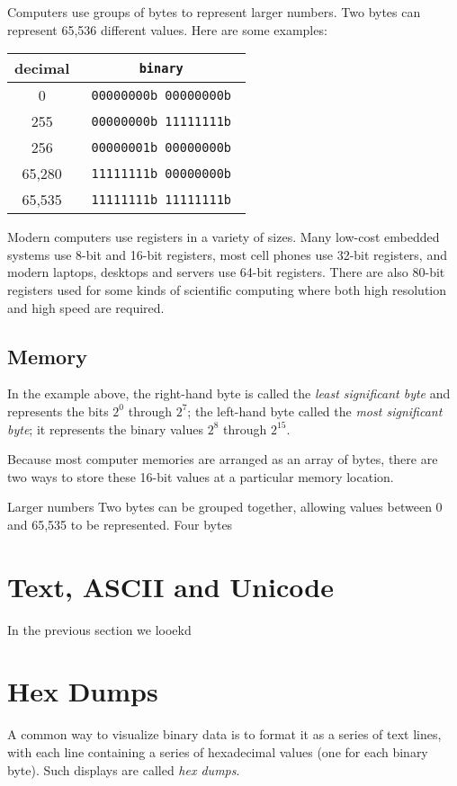 Computers use groups of bytes to represent larger numbers. Two bytes
can represent 65,536 different values. Here are some examples:

\begin{tabular}{c>{\tt}c}
decimal & \textrm{binary} \\
\hline
0      & 00000000b 00000000b \\
255    & 00000000b 11111111b \\
256    & 00000001b 00000000b \\
65,280 & 11111111b 00000000b \\
65,535 & 11111111b 11111111b \\
\hline
\end{tabular}

Modern computers use registers in a variety of sizes. Many low-cost
embedded systems use 8-bit and 16-bit registers, most cell phones use
32-bit registers, and modern laptops, desktops and servers use
64-bit registers. There are also 80-bit registers used for some kinds
of scientific computing where both high resolution and high speed are required.

\subsection{Memory}

In the example above, the right-hand byte is called the \emph{least
  significant byte} and represents the bits $2^0$ through $2^7$; the
left-hand byte  called the \emph{most
significant byte}; it represents the binary values $2^8$ through
$2^{15}$. 


Because most computer memories are arranged as an array of bytes,
there are two ways to store these 16-bit values at a particular memory
location. 



Larger numbers Two bytes can be grouped together, allowing values between 0 and
65,535 to be represented. Four bytes


\section{Text, ASCII and Unicode}\label{sec:letters}

In the previous section we looekd 

\section{Hex Dumps}\label{sec:hex-dumps}
A common way to visualize binary data is to format it as a series of
text lines, with each line containing a series of hexadecimal values (one
for each binary byte). Such displays are called \emph{hex
  dumps}.

